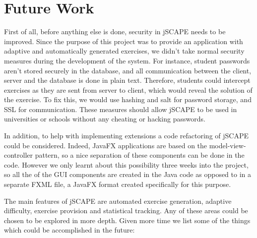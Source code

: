 \section{Future Work}
\label{sec:future-work}
First of all, before anything else is done, security in jSCAPE needs to be improved. Since the purpose of this project was to provide an application with adaptive and automatically generated exercises, we didn't take normal security measures during the development of the system. For instance, student passwords aren't stored securely in the database, and all communication between the client, server and the database is done in plain text. Therefore, students could intercept exercises as they are sent from server to client, which would reveal the solution of the exercise. To fix this, we would use hashing and salt for password storage, and SSL for communication. These measures should allow jSCAPE to be used in universities or schools without any cheating or hacking passwords. \newline

In addition, to help with implementing extensions a code refactoring of jSCAPE could be considered. Indeed, \textsf{JavaFX} applications are based on the model-view-controller pattern, so a nice separation of these components can be done in the code. However we only learnt about this possibility three weeks into the project, so all the of the GUI components are created in the Java code as opposed to in a separate \textsf{FXML} file, a \textsf{JavaFX} format created specifically for this purpose.\newline

The main features of jSCAPE are automated exercise generation, adaptive difficulty, exercise provision and statistical tracking. Any of these areas could be chosen to be explored in more depth. Given more time we list some of the things which could be accomplished in the future:

